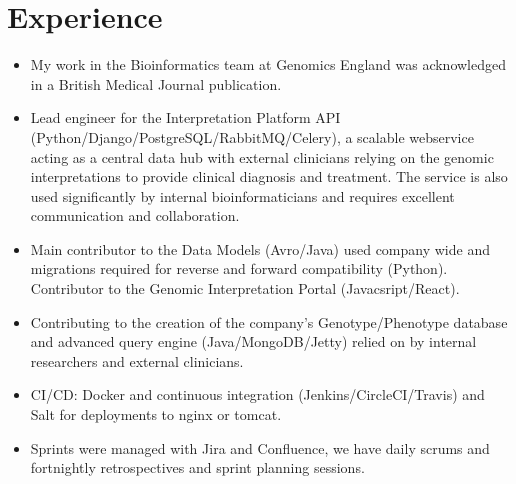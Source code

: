 \documentclass[11pt,a4paper,sans]{moderncv}        %
\begin{document}
\section{Experience}
{
\begin{itemize}%
\item My work in the Bioinformatics team at Genomics England was acknowledged in a British Medical Journal publication.
\item Lead engineer for the Interpretation Platform API (Python/Django/PostgreSQL/RabbitMQ/Celery), a scalable webservice acting as a central data hub 
with external clinicians relying on the genomic interpretations to provide clinical diagnosis and treatment. The service is also used significantly by internal bioinformaticians and requires excellent communication and collaboration.
\item Main contributor to the Data Models (Avro/Java) used company wide and migrations required for reverse and forward compatibility (Python). Contributor to the Genomic Interpretation Portal (Javacsript/React).
\item Contributing to the creation of the company's Genotype/Phenotype database and advanced query engine (Java/MongoDB/Jetty) relied on by internal researchers and external clinicians.
\item CI/CD: Docker and continuous integration (Jenkins/CircleCI/Travis) and Salt for deployments  to nginx or tomcat.
\item Sprints were managed with Jira and Confluence, we have daily scrums and fortnightly retrospectives and sprint planning sessions.
\end{itemize}
}
\end{document}
